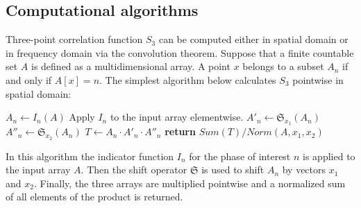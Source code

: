 \documentclass[reprint,amsmath,amssymb,aps,pre,showkeys,showpacs]{revtex4-1}
\begin{document}
\subsection{Computational algorithms}
Three-point correlation function $S_3$ can be computed either in spatial domain
or in frequency domain via the convolution theorem. Suppose that a finite
countable set $A$ is defined as a multidimensional array. A point $x$ belongs to
a subset $A_n$ if and only if $A[x] = n$. The simplest algorithm below
calculates $S_3$ pointwise in spatial domain:
\begin{algorithmic}[1]
  \State $A_n \gets I_n (A)$
  \Comment Apply $I_n$ to the input array elementwise.
  \State $A'_n \gets \mathfrak{S}_{x_1}(A_n)$
  \State $A''_n \gets \mathfrak{S}_{x_2}(A_n)$
  \State $T \gets A_n \cdot A'_n \cdot A''_n$
  \State \textbf{return} $Sum(T) / Norm(A, x_1, x_2)$
  \EndProcedure
\end{algorithmic}
In this algorithm the indicator function $I_n$ for the phase of interest $n$ is
applied to the input array $A$. Then the shift operator $\mathfrak{S}$ is used
to shift $A_n$ by vectors $x_1$ and $x_2$. Finally, the three arrays are
multiplied pointwise and a normalized sum of all elements of the product is
returned.
\end{document}

